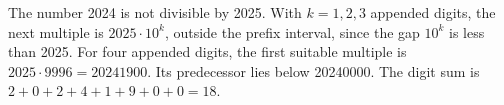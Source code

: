 The number 2024 is not divisible by 2025. With $k=1,2,3$ appended digits, the next multiple is $2025\cdot10^k$, outside the prefix interval, since the gap $10^k$ is less than 2025. For four appended digits, the first suitable multiple is $2025\cdot9996=20241900$. Its predecessor lies below 20240000. The digit sum is $2+0+2+4+1+9+0+0=\boxed{18}$.
